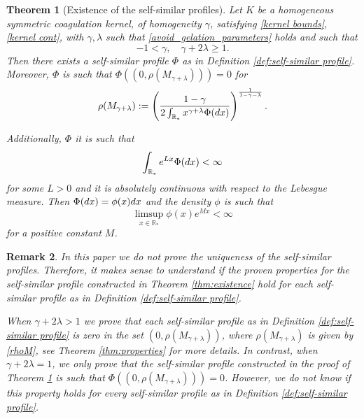 \documentclass[11pt]{article}
\numberwithin{equation}{section}
\theoremstyle{plain}
\newtheorem{theorem}{Theorem}[section]
\newtheorem{remark}[theorem]{Remark}
\newcommand{\der}{\textup{d}}
\begin{document}
\begin{theorem}[Existence of the self-similar profiles] \label{thm:existence and properties} 
Let $K$ be a homogeneous symmetric coagulation kernel, of homogeneity $\gamma$, satisfying
\eqref{kernel bounds}, \eqref{kernel cont}, with $\gamma , \lambda $ such that  \eqref{avoid_gelation_parameters} holds and such that
\[
-1 < \gamma, \quad \gamma+2\lambda \geq 1.
\] 
Then there exists a self-similar profile $\Phi$ as in Definition \ref{def:self-similar profile}.
Moreover, $\Phi$ is such that $\Phi((0, \rho(M_{\gamma+\lambda})))=0$ for 
\begin{equation}\label{rhoM} 
 \rho(M_{\gamma+\lambda}) :=  \left( \frac{1-\gamma }{2 \int_{\mathbb R_*} x^{\gamma + \lambda } \Phi(\der x ) }\right)^{\frac{1}{1-\gamma -\lambda }}.
\end{equation}

Additionally, $\Phi$ it is such that
\[
\int_{\mathbb R_*} e^{Lx } \Phi(\der x) < \infty 
\] 
for some $L>0$ and it is absolutely continuous with respect to the Lebesgue measure. 
Then $\Phi(\der x )=\phi(x) \der x $ and the density $\phi$ is such that 
\[
\limsup_{x \in \mathbb R_*} \phi(x) e^{M x} < \infty
\]
for a positive constant $M$. 
 \end{theorem} 
 \begin{remark}
In this paper we do not prove the uniqueness of the self-similar profiles. Therefore, it makes sense to understand if the proven properties for the self-similar profile constructed in Theorem \ref{thm:existence} hold for each self-similar profile as in Definition \ref{def:self-similar profile}. 

When $\gamma + 2 \lambda >1 $ we prove that each self-similar profile as in Definition \ref{def:self-similar profile} is zero in the set $(0, \rho(M_{\gamma+\lambda}))$, where $\rho(M_{\gamma+\lambda})$ is given by \eqref{rhoM}, see Theorem \ref{thm:properties} for more details. 
 In contrast, when $\gamma + 2 \lambda =1 $, we only prove that the self-similar profile constructed in the proof of Theorem \ref{thm:existence and properties} is such that $\Phi((0, \rho(M_{\gamma+\lambda})))=0$. 
However, we do not know if this property holds for every self-similar profile as in Definition \ref{def:self-similar profile}. 
 \end{remark}
\end{document}
